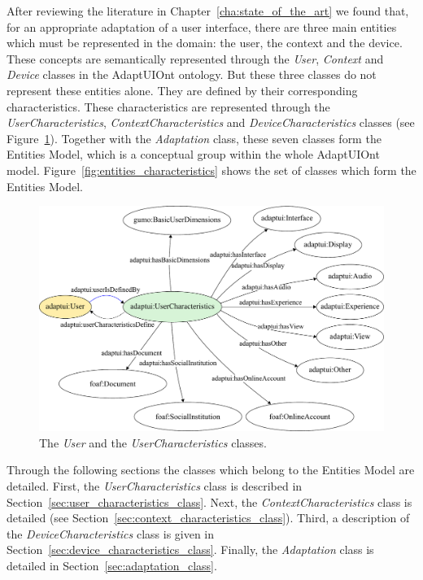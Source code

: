 After reviewing the literature in Chapter~\ref{cha:state_of_the_art} we found
that, for an appropriate adaptation of a user interface, there are three main
entities which must be represented in the domain: the user, the context and the
device. These concepts are semantically represented through the \textit{User},
\textit{Context} and \textit{Device} classes in the AdaptUIOnt ontology. But 
these three classes do not represent these entities alone. They are defined by 
their corresponding characteristics. These characteristics are represented through 
the \textit{UserCharacteristics}, \textit{ContextCharacteristics} and
\textit{DeviceCharacteristics} classes (see Figure~\ref{fig:user_characteristics_class}).
Together with the \textit{Adaptation} class, these seven classes form the Entities
Model, which is a conceptual group within the whole AdaptUIOnt model.
Figure~\ref{fig:entities_characteristics} shows the set of classes which form
the Entities Model.

\begin{figure}[H]
\centering
\includegraphics[width=1.0\textwidth]{../figures/PDF/user_characteristics_class.pdf}
\caption{The \textit{User} and the \textit{UserCharacteristics} classes.}
\label{fig:user_characteristics_class}
\end{figure}

Through the following sections the classes which belong to the Entities Model
are detailed. First, the \textit{UserCharacteristics} class is described in
Section~\ref{sec:user_characteristics_class}. Next, the \textit{ContextCharacteristics}
class is detailed (see Section~\ref{sec:context_characteristics_class}). Third,
a description of the \textit{DeviceCharacteristics} class is given in
Section~\ref{sec:device_characteristics_class}. Finally, the \textit{Adaptation}
class is detailed in Section~\ref{sec:adaptation_class}.


